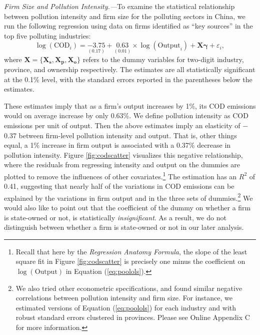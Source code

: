 \documentclass[AEJ]{AEA}
\renewcommand{\vec}[1]{\ensuremath{\mathbf{#1}}}
\begin{document}
\textit{Firm Size and Pollution Intensity.---}To examine the statistical relationship between pollution intensity and firm size for the polluting sectors in China, we run the following regression using data on firms identified as ``key sources'' in the top five polluting industries:
\begin{equation}
    \log (\text{COD}_i) = \underset{(0.17)}{-3.75} + \underset{(0.01)}{0.63} \times \log (\text{Output}_i) + \vec{X} \vec{\gamma} + \varepsilon_i,
\label{eq:poolols}
\end{equation}
where $\vec{X} = \{\vec{X_s}, \vec{X_p}, \vec{X_o}\}$ refers to the dummy variables for two-digit industry, province, and ownership respectively. The estimates are all statistically significant at the 0.1\% level, with the standard errors reported in the parentheses below the estimates.

These estimates imply that as a firm's output increases by 1\%, its COD emissions would on average increase by only 0.63\%. We define pollution intensity as COD emissions per unit of output. Then the above estimates imply an elasticity of $-$0.37 between firm-level pollution intensity and output. That is, other things equal, a 1\% increase in firm output is associated with a 0.37\% decrease in pollution intensity. Figure \ref{fig:codscatter} visualizes this negative relationship, where the residuals from regressing intensity and output on the dummies are plotted to remove the influences of other covariates.\footnote{Recall that here by the \textit{Regression Anatomy Formula}, the slope of the least square fit in Figure \ref{fig:codscatter} is precisely one minus the coefficient on $\log(\text{Output})$ in Equation (\ref{eq:poolols}).} The estimation has an $R^2$ of 0.41, suggesting that nearly half of the variations in COD emissions can be explained by the variations in firm output and in the three sets of dummies.\footnote{We also tried other econometric specifications, and found similar negative correlations between pollution intensity and firm size. For instance, we estimated versions of Equation (\ref{eq:poolols}) for each industry and with robust standard errors clustered in provinces. Please see Online Appendix C for more information.} We would also like to point out that the coefficient of the dummy on whether a firm is state-owned or not, is statistically \textit{insignificant}. As a result, we do not distinguish between whether a firm is state-owned or not in our later analysis.
\end{document}
